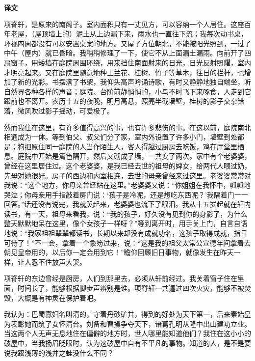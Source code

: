 \documentclass[12pt,UTF-8,openany,a4]{ctexbook}
\begin{document}
\newpage

\begin{Large}
    \noindent\textbf{译文}
\end{Large}


\vspace{1em}

\begin{large}
    \yiwen 
    项脊轩，是原来的南阁子。室内面积只有一丈见方，可以容纳一个人居住。这座百年老屋，（屋顶墙上的）泥土从上边漏下来，雨水也一直往下流；我每次动书桌，环视四周都没有可以安置桌案的地方。又屋子方位朝北，不能被阳光照到，一过了中午（屋内）就已昏暗。我稍稍修理了一下，使它不从上面漏土漏雨。向前开了四扇窗子，用矮墙在庭院周围环绕，用来挡住南面射来的日光，日光反射照耀，室内才明亮起来。又在庭院里随意地种上兰花、桂树、竹子等草木，往日的栏杆，也增加了新的光彩。书摆满了书架，我仰头高声吟诵诗歌，有时又静静地独自端坐，听自然界各种各样的声音；庭院、台阶前静悄悄的，小鸟不时飞下来啄食，人走到它跟前也不离开。农历十五的夜晚，明月高悬，照亮半截墙壁，桂树的影子交杂错落，微风吹过影子摇动，可爱极了。
    
    然而我住在这里，有许多值得高兴的事，也有许多悲伤的事。在这以前，庭院南北相通成为一体。等到伯父、叔父们分了家，室内外设置了许多小门，墙壁到处都是；狗把原住同一庭院的人当作陌生人，客人得越过厨房去吃饭，鸡在厅堂里栖息。庭院中开始是篱笆隔开，然后又砌成了墙，一共变了两次。家中有个老婆婆，曾经在这里居住过。这个老婆婆，是我已经去世的祖母的婢女，给两代人喂过奶，先母对她很好。房子的西边和内室相连，去世的母亲曾经来过这里。老婆婆常常对我说：“这个地方，你母亲曾经站在这里。”老婆婆又说：“你姐姐在我怀中，呱呱地哭泣；你母亲用手指敲着房门说：‘孩子是冷呢，还是想吃东西呢？’我隔着门一一回答。”话还没有说完，我就哭起来，老婆婆也流下了眼泪。我从十五岁起就在轩内读书，有一天，祖母来看我，说：“我的孩子，好久没有见到你的身影了，为什么整天默默地呆在这里，像个女孩子一样呀？”等到离开时，用手关上门，自言自语地说：“我家祖祖辈辈都读书，长期以来却没有成就功名，这孩子取得成就，指日可待了！”不一会，拿着一个象笏过来，说：“这是我的祖父太常公宣德年间拿着去朝见皇帝用的，以后你一定会用到它！”瞻仰回顾旧日事物，就像发生在昨天一样，让人忍不住放声大哭。
    
    项脊轩的东边曾经是厨房，人们到那里去，必须从轩前经过。我关着窗子住在里面，时间长了，能够根据脚步声辨别是谁。项脊轩一共遭过四次火灾，能够不被焚毁，大概是有神灵在保护着吧。
    
    我认为：巴蜀寡妇名叫清的，守着丹砂矿井，得到的好处为天下第一，后来秦始皇为表彰她而筑了女怀清台。刘备和曹操争夺天下，诸葛孔明从隆中出山建功立业。当这两个人无声无息地住在偏僻的地方时，世人哪里能知道他们？我住在这小小的破屋中，当我扬眉眨眼时，认为这破屋中自有不平凡的事物。知道的人，是不是要说我跟浅薄的浅井之蛙没什么不同？
    

\end{large}
\end{document}
